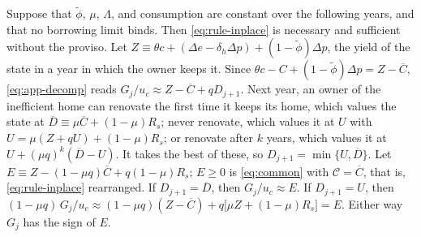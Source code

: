 \begin{remark}\label{rem:constant}
Suppose that $\tilde\phi$, $\mu$, $\Lambda$, and consumption are constant
over the following years, and that no borrowing limit binds. Then
\eqref{eq:rule-inplace} is necessary and sufficient without the proviso.
Let $Z\equiv\theta c+(\Delta e-\delta_h\Delta p)+(1-\tilde\phi)\Delta p$,
the yield of the state in a year in which the owner keeps it. Since
$\theta c-C+(1-\tilde\phi)\Delta p=Z-\overline C$, \eqref{eq:app-decomp}
reads $G_j/u_c\approx Z-\overline C+qD_{j+1}$. Next year, an owner of the
inefficient home can renovate the first time it keeps its home, which values the
state at $\overline D\equiv\mu\overline C+(1-\mu)R_s$; never renovate,
which values it at $U$ with $U=\mu(Z+qU)+(1-\mu)R_s$; or renovate after
$k$ years, which values it at $U+(\mu q)^k(\overline D-U)$. It takes the
best of these, so $D_{j+1}=\min\{U,\overline D\}$. Let
$E\equiv Z-(1-\mu q)\overline C+q(1-\mu)R_s$; $E\ge0$ is
\eqref{eq:common} with $\mathcal C=\overline C$, that is,
\eqref{eq:rule-inplace} rearranged. If $D_{j+1}=\overline D$, then
$G_j/u_c\approx E$. If $D_{j+1}=U$, then
$(1-\mu q)\,G_j/u_c\approx(1-\mu q)(Z-\overline C)+q\bigl[\mu Z+(1-\mu)R_s\bigr]=E$.
Either way $G_j$ has the sign of $E$.
\end{remark}

